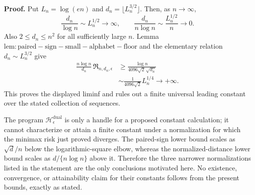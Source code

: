 \textbf{Proof.}
Put \(L_n=\log(en)\) and \(d_n=\lfloor L_n^{3/2}\rfloor\).  Then, as \(n\to\infty\),
\[
 \frac{d_n}{\log n}\sim L_n^{1/2}\longrightarrow\infty,
 \qquad
 \frac{d_n}{n\log n}\sim\frac{L_n^{1/2}}n\longrightarrow0.
\]
Also \(2\le d_n\le n^2\) for all sufficiently large \(n\).  Lemma \(\mathrm{lem:paired-sign-small-alphabet-floor}\) and the elementary relation \(d_n\sim L_n^{3/2}\) give
\[
 \begin{aligned}
 \frac{n\log n}{d_n}\,
 \mathfrak R_{n,d_n,\epsilon}
 &\ge
 \frac{\log n}{4096\sqrt2\,\sqrt{d_n}}\\
 &\sim\frac{1}{4096\sqrt2}L_n^{1/4}
 \longrightarrow+\infty.
 \end{aligned}
\]
This proves the displayed liminf and rules out a finite universal leading constant over the stated collection of sequences.

The program \(\mathscr H_\epsilon^{\mathrm{dual}}\) is only a handle for a proposed constant calculation; it cannot characterize or attain a finite constant under a normalization for which the minimax risk just proved diverges.  The paired-sign lower bound scales as \(\sqrt d/n\) below the logarithmic-square elbow, whereas the normalized-distance lower bound scales as \(d/\{n\log n\}\) above it.  Therefore the three narrower normalizations listed in the statement are the only conclusions motivated here.  No existence, convergence, or attainability claim for their constants follows from the present bounds, exactly as stated.
